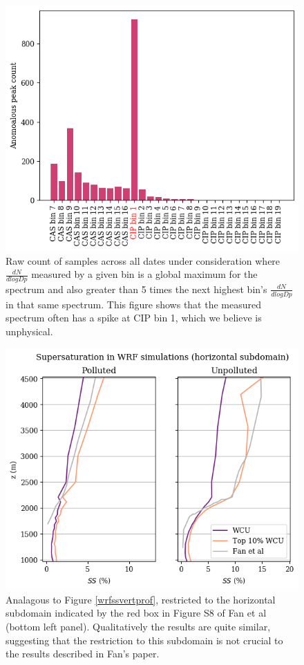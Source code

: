 \documentclass{article}
\begin{document}
\begin{figure}[ht]
	\centering
	\includegraphics[width=\textwidth]{halo/v2_anomalous_spectrum_counts_figure.png}
	\caption{Raw count of samples across all dates under consideration where $\frac{dN}{dlogDp}$ measured by a given bin is a global maximum for the spectrum and also greater than 5 times the next highest bin's $\frac{dN}{dlogDp}$ in that same spectrum. This figure shows that the measured spectrum often has a spike at CIP bin 1, which we believe is unphysical.}
	\label{cipbin1anom}
\end{figure}

\begin{figure}[ht]
	\centering
	\includegraphics[width=\textwidth]{wrf/subdom_ss_pred_vs_z_figure.png}
	\caption{Analagous to Figure \ref{wrfssvertprof}, restricted to the horizontal subdomain indicated by the red box in Figure S8 of Fan et al (bottom left panel). Qualitatively the results are quite similar, suggesting that the restriction to this subdomain is not crucial to the results described in Fan's paper.}
	\label{wrfsubdomssvertprof}
\end{figure}
\end{document}
